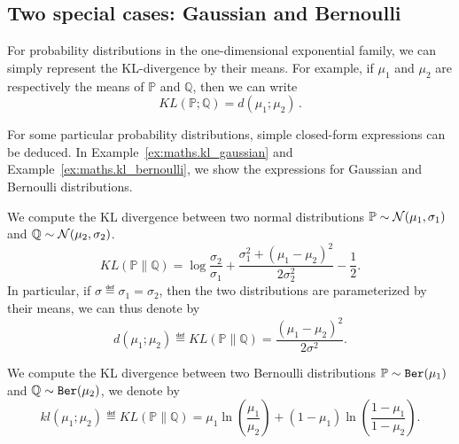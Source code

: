\subsection{Two special cases: Gaussian and Bernoulli}\label{app:maths.information.examples}

For probability distributions in the one-dimensional exponential family, we can simply represent the KL-divergence by their means. For example, if $\mu_1$ and $\mu_2$ are respectively the means of $\mathbb{P}$ and $\mathbb{Q}$, then we can write
\[
    KL(\mathbb{P};\mathbb{Q}) = d(\mu_1;\mu_2)\,.
\]

For some particular probability distributions, simple closed-form expressions can be deduced. In Example~\ref{ex:maths.kl_gaussian} and Example~\ref{ex:maths.kl_bernoulli}, we show the expressions for Gaussian and Bernoulli distributions.

\begin{example}\label{ex:maths.kl_gaussian}
\begin{leftbar}[examplebar]
	We compute the KL divergence between two normal distributions $\mathbb{P}\sim\mathcal{N}(\mu_1,\sigma_1)$ and $\mathbb{Q}\sim\mathcal{N}(\mu_2,\sigma_2)$.
	\[
		KL(\mathbb{P} \lVert \mathbb{Q}) = \log \frac{\sigma_2}{\sigma_1} + \frac{\sigma_1^2+(\mu_1-\mu_2)^2}{2\sigma_2^2} - \frac{1}{2}.
	\]
In particular, if $\sigma\eqdef\sigma_1=\sigma_2$, then the two distributions are parameterized by their means, we can thus denote by
	\[
		d(\mu_1;\mu_2) \eqdef KL(\mathbb{P} \lVert \mathbb{Q}) = \frac{(\mu_1-\mu_2)^2}{2\sigma^2}.
	\]
\end{leftbar}
\end{example}

\begin{example}\label{ex:maths.kl_bernoulli}
\begin{leftbar}[examplebar]
    We compute the KL divergence between two Bernoulli distributions $\mathbb{P}\sim\texttt{Ber}(\mu_1)$ and $\mathbb{Q}\sim\texttt{Ber}(\mu_2)$, we denote by
     \[
        kl(\mu_1;\mu_2) \eqdef KL(\mathbb{P} \lVert \mathbb{Q}) =  \mu_1 \ln \left( \frac{\mu_1}{\mu_2} \right) + (1-\mu_1) \ln  \left( \frac{1-\mu_1}{1-\mu_2} \right).
    \]
\end{leftbar}
\end{example}
